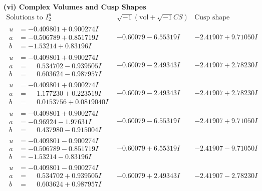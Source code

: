 \documentclass[1p]{elsarticle_modified}
\theoremstyle{definition}
\newcommand{\I}{\sqrt{-1}}
\begin{document}
\newpage\flushleft \textbf{(vi) Complex Volumes and Cusp Shapes}
$$\begin{array}{c|c|c}  
\text{Solutions to }I^u_{2}& \I (\text{vol} + \sqrt{-1}CS) & \text{Cusp shape}\\
 \hline 
\begin{aligned}
u &= -0.409801 + 0.900274 I \\
a &= -0.506789 + 0.851719 I \\
b &= -1.53214 + 0.83196 I\end{aligned}
 & -0.60079 - 6.55319 I & -2.41907 + 9.71050 I \\ \hline\begin{aligned}
u &= -0.409801 + 0.900274 I \\
a &= \phantom{-}0.534702 - 0.939505 I \\
b &= \phantom{-}0.603624 - 0.987957 I\end{aligned}
 & -0.60079 - 2.49343 I & -2.41907 + 2.78230 I \\ \hline\begin{aligned}
u &= -0.409801 + 0.900274 I \\
a &= \phantom{-}1.177230 + 0.223519 I \\
b &= \phantom{-}0.0153756 + 0.0819040 I\end{aligned}
 & -0.60079 - 2.49343 I & -2.41907 + 2.78230 I \\ \hline\begin{aligned}
u &= -0.409801 + 0.900274 I \\
a &= -0.96924 - 1.97631 I \\
b &= \phantom{-}0.437980 - 0.915004 I\end{aligned}
 & -0.60079 - 6.55319 I & -2.41907 + 9.71050 I \\ \hline\begin{aligned}
u &= -0.409801 - 0.900274 I \\
a &= -0.506789 - 0.851719 I \\
b &= -1.53214 - 0.83196 I\end{aligned}
 & -0.60079 + 6.55319 I & -2.41907 - 9.71050 I \\ \hline\begin{aligned}
u &= -0.409801 - 0.900274 I \\
a &= \phantom{-}0.534702 + 0.939505 I \\
b &= \phantom{-}0.603624 + 0.987957 I\end{aligned}
 & -0.60079 + 2.49343 I & -2.41907 - 2.78230 I \\ \hline\begin{aligned}

\end{aligned}
\end{array}$$
\end{document}
